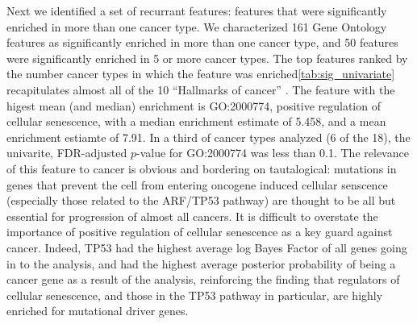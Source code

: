 Next we identified a set of recurrant features: features that were significantly enriched in more than one cancer type.  We characterized 161 Gene Ontology features as significantly enriched in more than one cancer type, and 50
features were significantly enriched in 5 or more cancer types.  The top features ranked by the number cancer types in which the feature was enriched\ref{tab:sig_univariate} recapitulates almost all of the 10 ``Hallmarks of cancer''
\cite{Hanahan_2011}.  The feature with the higest mean (and median) enrichment is GO:2000774, positive regulation of cellular senescence, with a median enrichment estimate of 5.458, and a mean enrichment estiamte of 7.91.  In a third of cancer types analyzed (6 of the 18), the univarite, FDR-adjusted $p$-value for GO:2000774 was less than 0.1.  The relevance of this feature to cancer is obvious and bordering on tautalogical: mutations in genes that prevent the cell from entering oncogene induced cellular senscence (especially those related to the ARF/TP53 pathway) are thought to be all but essential for progression of almost all cancers\cite{chandeck10_oncog_induc_cellul_senes}.  It is difficult to overstate the importance of positive regulation of cellular senescence as a key guard against cancer.  Indeed, TP53 had the highest average log Bayes Factor of all genes going in to the analysis, and had the highest average posterior probability of being a cancer gene as a result of the analysis, reinforcing the finding that regulators of cellular senescence, and those in the TP53 pathway in particular, are highly enriched for mutational driver genes.

